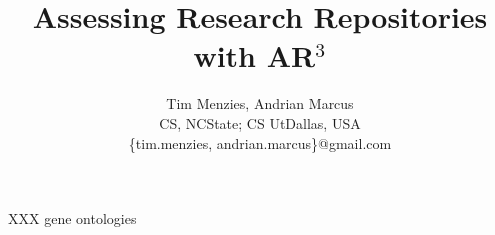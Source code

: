 \documentclass[journal]{IEEEtran}
\begin{document}
 
 
 
\newcommand{\IT}{{\textsf{{AR$^3$}}}}
\title{Assessing Research Repositories with {\IT}}%

\author{ Tim Menzies, Andrian Marcus \\
       CS, NCState; CS UtDallas, USA\\
     \{tim.menzies, andrian.marcus\}@gmail.com}
 
\maketitle    
  
%
%
%
%
%
%

XXX gene ontologies
\end{document}
